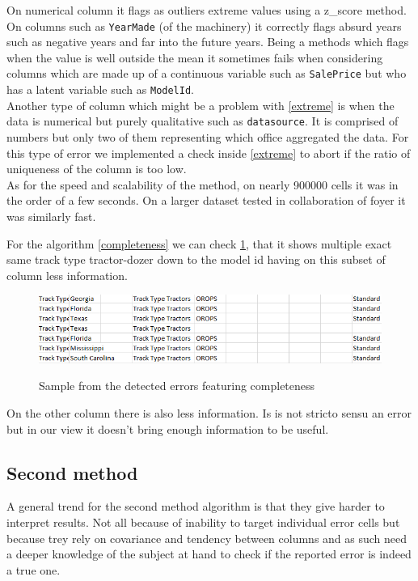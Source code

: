 \documentclass{article}
\begin{document}
On numerical column it flags as outliers extreme values using a z\_score method. On columns such as \texttt{YearMade} (of the machinery) it correctly flags absurd years such as negative years and far into the future years. Being a methods which flags when the value is well outside the mean it sometimes fails when considering columns which are made up of a continuous variable such as \texttt{SalePrice} but who has a latent variable such as \texttt{ModelId}. \\ Another type of column which might be a problem with \ref{extreme} is when the data is numerical but purely qualitative such as \texttt{datasource}. It is comprised of numbers but only two of them representing which office aggregated the data. For this type of error we implemented a check inside \ref{extreme} to abort if the ratio of uniqueness of the column is too low.\\
As for the speed and scalability of the method, on nearly 900000 cells it was in the order of a few seconds. On a larger dataset tested in collaboration of foyer it was similarly fast.

For the algorithm \ref{completeness} we can check \ref{fig:exp_completeness}, that it shows multiple exact same track type tractor-dozer down to the model id having on this subset of column less information.

\begin{figure}[h]
    \centering
    \includegraphics[width=0.6\linewidth]{picture/exp_completeness_db.png}
    \label{fig:exp_completeness}
    \caption{Sample from the detected errors featuring completeness}
\end{figure}
On the other column there is also less information. Is is not stricto sensu an error but in our view it doesn't bring enough information to be useful.

\subsection{Second method}
A general trend for the second method algorithm is that they give harder to interpret results. Not all because of inability to target individual error cells but because trey rely on covariance and tendency between columns and as such need a deeper knowledge of the subject at hand to check if the reported error is indeed a true one.
\end{document}
